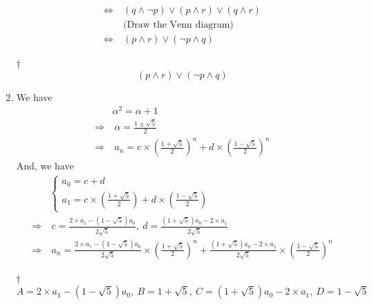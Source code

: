 \documentclass[a4paper,12pt]{article}
\begin{document}
\begin{enumerate}
\begin{equation}
\begin{aligned}
            \iff & \ (q \land \neg p) \lor (p \land r) \lor (q \land r) \\
            & \ \text{(Draw the Venn diagram)} \\
            \iff & \ (p \land r) \lor (\neg p \land q)
        \end{aligned}
    \end{equation} 
    \begin{answer}{$\dag$}\begin{equation}
            (p \land r) \lor (\neg p \land q)            
        \end{equation}
    \end{answer}
    \item We have \begin{equation}
        \begin{aligned}
            & \alpha^2 = \alpha + 1 \\
            \Rightarrow & \ \alpha = \frac{1 \pm \sqrt{5}}{2} \\
            \Rightarrow & \ a_n = c \times (\frac{1 + \sqrt{5}}{2})^n + d \times (\frac{1 - \sqrt{5}}{2})^n
        \end{aligned}
    \end{equation} And, we have \begin{equation}
        \begin{aligned}
            & \begin{cases}
                a_0 = c + d \\
                a_1 = c \times (\frac{1 + \sqrt{5}}{2}) + d \times (\frac{1 - \sqrt{5}}{2})
            \end{cases} \\
            \Rightarrow & \ c = \frac{2 \times a_1 - (1 - \sqrt{5})a_0}{2\sqrt{5}}, \ d = \frac{(1 + \sqrt{5})a_0 - 2 \times a_1}{2\sqrt{5}} \\
            \Rightarrow & \ a_n = \frac{2 \times a_1 - (1 - \sqrt{5})a_0}{2\sqrt{5}} \times (\frac{1 + \sqrt{5}}{2})^n + \frac{(1 + \sqrt{5})a_0 - 2 \times a_1}{2\sqrt{5}} \times (\frac{1 - \sqrt{5}}{2})^n
        \end{aligned}
    \end{equation}
    \begin{answer}{$\dag$}\begin{equation}
            A = 2 \times a_1 - (1 - \sqrt{5})a_0, \ B = 1 + \sqrt{5}, \ C = (1 + \sqrt{5})a_0 - 2 \times a_1, \ D = 1 - \sqrt{5}
        \end{equation}
    \end{answer}

\end{enumerate}
\end{document}
